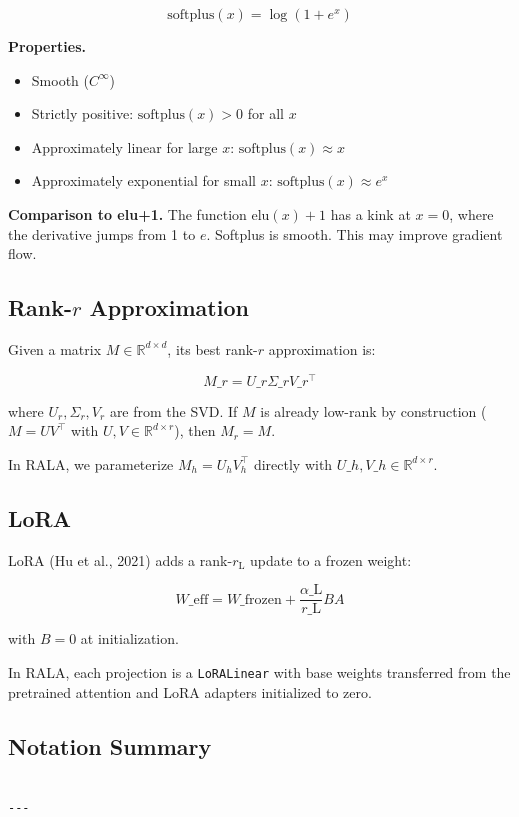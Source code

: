 \[
\text{softplus}(x) = \log(1 + e^x)
\tag{3.5}
\]

\textbf{Properties.}
\begin{itemize}
\item Smooth ($C^\infty$)
\item Strictly positive: $\text{softplus}(x) > 0$ for all $x$
\item Approximately linear for large $x$: $\text{softplus}(x) \approx x$
\item Approximately exponential for small $x$: $\text{softplus}(x) \approx e^x$

\end{itemize}
\textbf{Comparison to elu+1.} The function $\mathrm{elu}(x) + 1$ has a kink at 
$x = 0$, where the derivative jumps from 1 to $e$. Softplus is smooth. This 
may improve gradient flow.

\subsection{Rank-$r$ Approximation}

Given a matrix $M \in \mathbb{R}^{d \times d}$, its best rank-$r$ 
approximation is:

\[
M\_r = U\_r \Sigma\_r V\_r^\top
\tag{3.6}
\]

where $U_r, \Sigma_r, V_r$ are from the SVD. If $M$ is already low-rank by 
construction ($M = U V^\top$ with $U, V \in \mathbb{R}^{d \times r}$), then 
$M_r = M$.

In RALA, we parameterize $M_h = U_h V_h^\top$ directly with $U\_h, V\_h \in 
\mathbb{R}^{d \times r}$.

\subsection{LoRA}

LoRA (Hu et al., 2021) adds a rank-$r_{\text{L}}$ update to a frozen 
weight:

\[
W\_\text{eff} = W\_\text{frozen} + \frac{\alpha\_{\text{L}}}{r\_{\text{L}}} B A
\tag{3.7}
\]

with $B = 0$ at initialization.

In RALA, each projection is a \texttt{LoRALinear} with base weights transferred 
from the pretrained attention and LoRA adapters initialized to zero.

\subsection{Notation Summary}

\begin{lstlisting}

---
\end{lstlisting}